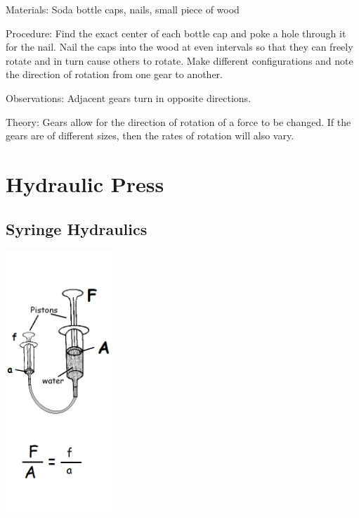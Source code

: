 \begin{multicols}{2}
\begin{description*}
\item[Materials:]{Soda bottle caps, nails, small piece of wood}
\item[Procedure:]{Find the exact center of each bottle cap and poke a hole through it for the nail. Nail the caps into the wood at even intervals so that they can freely rotate and in turn cause others to rotate. Make different configurations and note the direction of rotation from one gear to another.}
\item[Observations:]{Adjacent gears turn in opposite directions.}
\item[Theory:]{Gears allow for the direction of rotation of a force to be changed. If the gears are of different sizes, then the rates of rotation will also vary.}
\end{description*}

\vfill
\columnbreak


\section*{Hydraulic Press}


\subsection{Syringe Hydraulics}

\begin{center}
\includegraphics[width=0.3\textwidth]{./img/source/hydraulic-press-2.png}
\end{center}


\end{multicols}
